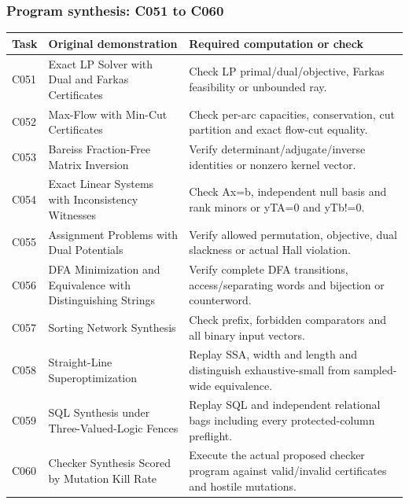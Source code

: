 \documentclass[
  11pt,
]{article}
\begin{document}
\subsubsection{Program synthesis: C051 to
C060}\label{program-synthesis-c051-to-c060}

\begin{longtable}[]{@{}
  >{\raggedright\arraybackslash}p{}
  >{\raggedright\arraybackslash}p{}
  >{\raggedright\arraybackslash}p{}@{}}
\toprule\noalign{}
\begin{minipage}[b]{\linewidth}\raggedright
Task
\end{minipage} & \begin{minipage}[b]{\linewidth}\raggedright
Original demonstration
\end{minipage} & \begin{minipage}[b]{\linewidth}\raggedright
Required computation or check
\end{minipage} \\
\midrule\noalign{}
\endhead
\bottomrule\noalign{}
\endlastfoot
C051 & Exact LP Solver with Dual and Farkas Certificates & Check LP
primal/dual/objective, Farkas feasibility or unbounded ray. \\
C052 & Max-Flow with Min-Cut Certificates & Check per-arc capacities,
conservation, cut partition and exact flow-cut equality. \\
C053 & Bareiss Fraction-Free Matrix Inversion & Verify
determinant/adjugate/inverse identities or nonzero kernel vector. \\
C054 & Exact Linear Systems with Inconsistency Witnesses & Check Ax=b,
independent null basis and rank minors or yTA=0 and yTb!=0. \\
C055 & Assignment Problems with Dual Potentials & Verify allowed
permutation, objective, dual slackness or actual Hall violation. \\
C056 & DFA Minimization and Equivalence with Distinguishing Strings &
Verify complete DFA transitions, access/separating words and bijection
or counterword. \\
C057 & Sorting Network Synthesis & Check prefix, forbidden comparators
and all binary input vectors. \\
C058 & Straight-Line Superoptimization & Replay SSA, width and length
and distinguish exhaustive-small from sampled-wide equivalence. \\
C059 & SQL Synthesis under Three-Valued-Logic Fences & Replay SQL and
independent relational bags including every protected-column
preflight. \\
C060 & Checker Synthesis Scored by Mutation Kill Rate & Execute the
actual proposed checker program against valid/invalid certificates and
hostile mutations. \\
\end{longtable}
\end{document}
